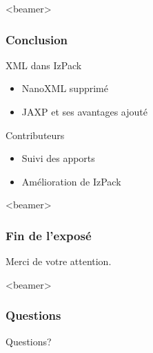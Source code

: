 \begin{frame}<beamer>
\frametitle{Conclusion}
\begin{beamerboxesrounded}[shadow=true]{XML dans IzPack}
\begin{itemize}
	\item NanoXML supprimé
	\item JAXP et ses avantages ajouté
\end{itemize}
\end{beamerboxesrounded}
\vfill
\begin{beamerboxesrounded}[shadow=true]{Contributeurs}
\begin{itemize}
	\item Suivi des apports
	\item Amélioration de IzPack
\end{itemize}
\end{beamerboxesrounded}
\end{frame}
\begin{frame}<beamer>\frametitle{Fin de l'exposé}
\begin{center}
Merci de votre attention.
\end{center}
\end{frame}
\begin{frame}<beamer>\frametitle{Questions}
\begin{center}
Questions?
\end{center}
\end{frame}
